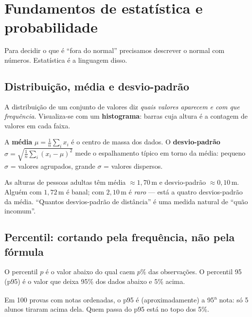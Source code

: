 \section{Fundamentos de estatística e probabilidade}
\label{sec:estatistica}

Para decidir o que é ``fora do normal'' precisamos descrever o normal com
números. Estatística é a linguagem disso.

\subsection{Distribuição, média e desvio-padrão}
\begin{definicao}[Distribuição]
A distribuição de um conjunto de valores diz \emph{quais valores aparecem e com
que frequência}. Visualiza-se com um \textbf{histograma}: barras cuja altura é a
contagem de valores em cada faixa.
\end{definicao}

\begin{definicao}
A \textbf{média} $\mu = \frac{1}{n}\sum_i x_i$ é o centro de massa dos dados.
O \textbf{desvio-padrão} $\sigma = \sqrt{\frac{1}{n}\sum_i (x_i-\mu)^2}$ mede o
espalhamento típico em torno da média: pequeno $\sigma$ = valores agrupados,
grande $\sigma$ = valores dispersos.
\end{definicao}

\begin{intuicao}
As alturas de pessoas adultas têm média $\approx 1{,}70$\,m e desvio-padrão
$\approx 0{,}10$\,m. Alguém com $1{,}72$\,m é banal; com $2{,}10$\,m é
\emph{raro} --- está a quatro desvios-padrão da média. ``Quantos desvios-padrão
de distância'' é uma medida natural de ``quão incomum''.
\end{intuicao}

\subsection{Percentil: cortando pela frequência, não pela fórmula}
\begin{definicao}[Percentil]
O percentil $p$ é o valor abaixo do qual caem $p\%$ das observações. O
percentil 95 (p95) é o valor que deixa 95\% dos dados abaixo e 5\% acima.
\end{definicao}

\begin{exemplo}
Em 100 provas com notas ordenadas, o p95 é (aproximadamente) a 95\textsuperscript{a}
nota: só 5 alunos tiraram acima dela. Quem passa do p95 está no topo dos 5\%.
\end{exemplo}

